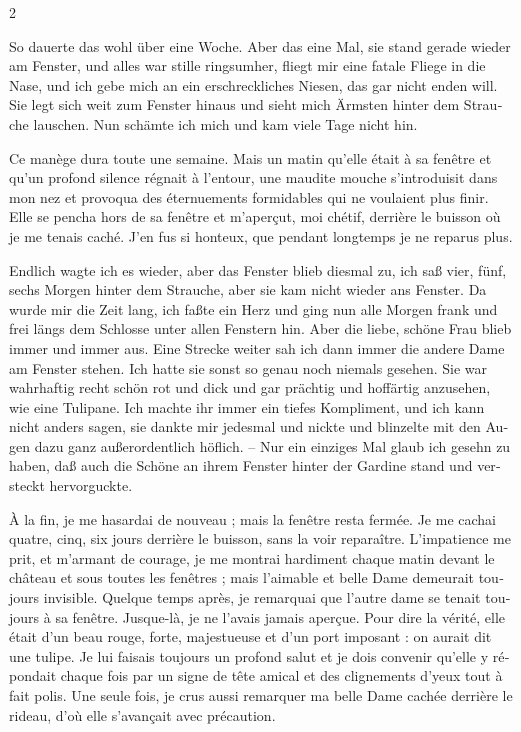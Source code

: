 \documentclass[a4paper,11pt]{article}
\newcommand\chunks[2]{%
\begin{leftcolumn*}\begin{otherlanguage}{german}%
{#1}%
\end{otherlanguage}\end{leftcolumn*}%
\begin{rightcolumn}\begin{otherlanguage}{french}%
{#2}%
\end{otherlanguage}\end{rightcolumn}%
}
\begin{document}
\begin{paracol}{2}
  \chunks{So dauerte das wohl über eine Woche. Aber das eine Mal, sie stand gerade wieder am Fenster, und alles war stille ringsumher, fliegt mir eine fatale Fliege in die Nase, und ich gebe mich an ein erschreckliches Niesen, das gar nicht enden will. Sie legt sich weit zum Fenster hinaus und sieht mich Ärmsten hinter dem Strauche lauschen. Nun schämte ich mich und kam viele Tage nicht hin.}
         {Ce manège dura toute une semaine. Mais un matin qu’elle était à sa fenêtre et qu’un profond silence régnait à l’entour, une maudite mouche s’introduisit dans mon nez et provoqua des éternuements formidables qui ne voulaient plus finir. Elle se pencha hors de sa fenêtre et m’aperçut, moi chétif, derrière le buisson où je me tenais caché. J’en fus si honteux, que pendant longtemps je ne reparus plus.}
  \chunks{Endlich wagte ich es wieder, aber das Fenster blieb diesmal zu, ich saß vier, fünf, sechs Morgen hinter dem Strauche, aber sie kam nicht wieder ans Fenster. Da wurde mir die Zeit lang, ich faßte ein Herz und ging nun alle Morgen frank und frei längs dem Schlosse unter allen Fenstern hin. Aber die liebe, schöne Frau blieb immer und immer aus. Eine Strecke weiter sah ich dann immer die andere Dame am Fenster stehen. Ich hatte sie sonst so genau noch niemals gesehen. Sie war wahrhaftig recht schön rot und dick und gar prächtig und hoffärtig anzusehen, wie eine Tulipane. Ich machte ihr immer ein tiefes Kompliment, und ich kann nicht anders sagen, sie dankte mir jedesmal und nickte und blinzelte mit den Augen dazu ganz außerordentlich höflich. – Nur ein einziges Mal glaub ich gesehn zu haben, daß auch die Schöne an ihrem Fenster hinter der Gardine stand und versteckt hervorguckte.}
         {À la fin, je me hasardai de nouveau ; mais la fenêtre resta fermée. Je me cachai quatre, cinq, six jours derrière le buisson, sans la voir reparaître. L’impatience me prit, et m’armant de courage, je me montrai hardiment chaque matin devant le château et sous toutes les fenêtres ; mais l’aimable et belle Dame demeurait toujours invisible. Quelque temps après, je remarquai que l’autre dame se tenait toujours à sa fenêtre. Jusque-là, je ne l’avais jamais aperçue. Pour dire la vérité, elle était d’un beau rouge, forte, majestueuse et d’un port imposant : on aurait dit une tulipe. Je lui faisais toujours un profond salut et je dois convenir qu’elle y répondait chaque fois par un signe de tête amical et des clignements d’yeux tout à fait polis. Une seule fois, je crus aussi remarquer ma belle Dame cachée derrière le rideau, d’où elle s’avançait avec précaution.}

\end{paracol}
\end{document}
